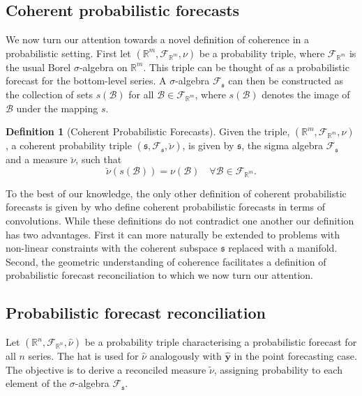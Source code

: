 \documentclass[12pt]{article}
\theoremstyle{definition}
\newtheorem{definition}{Definition}[section]
\begin{document}
\subsection{Coherent probabilistic forecasts}

We now turn our attention towards a novel definition of coherence in a probabilistic setting.  First let $(\mathbb{R}^m, \mathscr{F}_{\mathbb{R}^m}, \nu)$ be a probability triple, where $\mathscr{F}_{\mathbb{R}^m}$ is the usual Borel $\sigma$-algebra on $\mathbb{R}^m$. This triple can be thought of as a probabilistic forecast for the bottom-level series.  A $\sigma$-algebra $\mathscr{F}_{\mathfrak{s}}$ can then be constructed as the collection of sets $s(\mathcal{B})$ for all $\mathcal{B}\in \mathscr{F}_{\mathbb{R}^m}$, where $s(\mathcal{B})$ denotes the image of $\mathcal{B}$ under the mapping $s$.

\begin{definition}[Coherent Probabilistic Forecasts]\label{def:cohprob}
	Given the triple, $(\mathbb{R}^m, \mathscr{F}_{\mathbb{R}^m}, \nu)$, a coherent probability triple $(\mathfrak{s}, \mathscr{F}_{\mathfrak{s}}, \breve{\nu})$, is given by $\mathfrak{s}$, the sigma algebra $\mathscr{F}_{\mathfrak{s}}$ and a measure $\breve{\nu}$, such that
	\[
	\breve{\nu}(s(\mathcal{B})) = \nu(\mathcal{B}) \quad \forall \mathcal{B} \in \mathscr{F}_{\mathbb{R}^m}.
	\]
\end{definition}

To the best of our knowledge, the only other definition of coherent probabilistic forecasts is given by \cite{Taieb2017} who define coherent probabilistic forecasts in terms of convolutions. While these definitions do not contradict one another our definition has two advantages.  First it can more naturally be extended to problems with non-linear constraints with the coherent subspace $\mathfrak{s}$ replaced with a manifold.  Second, the geometric understanding of coherence facilitates a definition of probabilistic forecast reconciliation to which we now turn our attention.

\subsection{Probabilistic forecast reconciliation}

Let $(\mathbb{R}^n, \mathscr{F}_{\mathbb{R}^n}, \hat{\nu})$ be a probability triple characterising a probabilistic forecast for all $n$ series. The hat is used for $\hat{\nu}$ analogously with $\hat{\bm y}$ in the point forecasting case.  The objective is to derive a reconciled measure $\tilde{\nu}$, assigning probability to each element of the $\sigma$-algebra $\mathscr{F}_\mathfrak{s}$.
\end{document}
